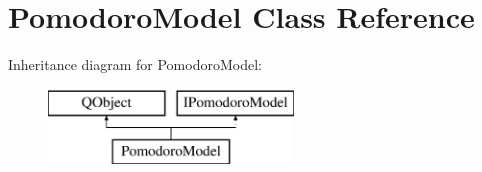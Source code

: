 \hypertarget{class_pomodoro_model}{}\section{Pomodoro\+Model Class Reference}
\label{class_pomodoro_model}
Inheritance diagram for Pomodoro\+Model\+:\begin{figure}[H]
\begin{center}
\leavevmode
\includegraphics[height=2.000000cm]{class_pomodoro_model}
\end{center}
\end{figure}
